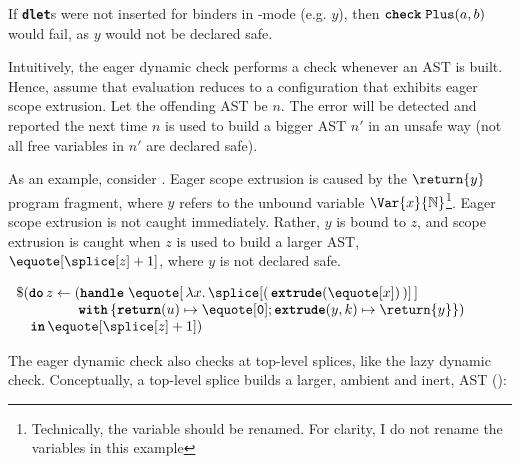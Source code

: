 If \textbf{\texttt{dlet}}s were not inserted for binders in \quotemode{}-mode (e.g. $y$), then $\textbf{\texttt{check}}\; \texttt{Plus}(a, b)$ would fail, as $y$ would not be declared safe. 

Intuitively, the eager dynamic check performs a check whenever an AST is built. Hence, assume that evaluation reduces to a configuration that exhibits eager scope extrusion. Let the offending AST be $n$. The error will be detected and reported the next time $n$ is used to build a bigger AST $n'$ in an unsafe way (not all free variables in $n'$ are declared safe). 

As an example, consider . Eager scope extrusion is caused by the $\return{y}$ program fragment, where $y$ refers to the unbound variable $\Var{x}{\mathbb{N}}$\footnote{Technically, the variable should be renamed. For clarity, I do not rename the variables in this example}. Eager scope extrusion is not caught immediately. Rather, $y$ is bound to $z$, and scope extrusion is caught when $z$ is used to build a larger AST, $\equote[{\splice[z]+1}]$, where $y$ is not declared safe. 

\begin{code} 
 \begin{source}
  $\begin{array}{l}
      \$(\textbf{\texttt{do}} \, z \leftarrow (\textbf{\texttt{handle}} \; \equote[{\, \lambda x. \,\splice[({{\, \textbf{\texttt{extrude}}(\equote[x]) \,}})]\,}] \\
      \quad\quad\quad\quad\,\; \textbf{\texttt{with}} \, \{ \textbf{\texttt{return}}(u) \mapsto {\equote[\texttt{0}]}; \textbf{\texttt{extrude}}(y, k) \mapsto {\return{y}}\})\\
      \quad \textbf{\texttt{in}} \, \equote[{\splice[z] + 1}])
    \end{array}$
 \end{source}
 \label{listing:eager-scope-extrusion-check-eg}
\end{code}

The eager dynamic check also checks at top-level splices, like the lazy dynamic check. Conceptually, a top-level splice builds a larger, ambient and inert, AST ():

